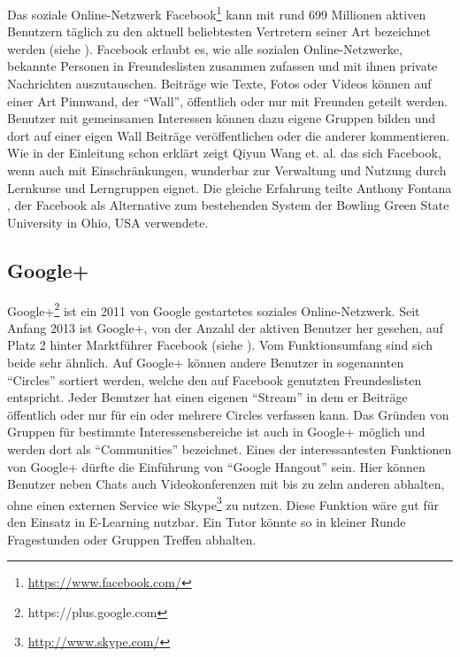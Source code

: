 Das soziale Online-Netzwerk Facebook\footnote{\url{https://www.facebook.com/}} kann mit rund 699 Millionen aktiven Benutzern täglich zu den aktuell beliebtesten Vertretern seiner Art bezeichnet werden (siehe \cite{Facebook2013}). Facebook erlaubt es, wie alle sozialen Online-Netzwerke, bekannte Personen in Freundeslisten zusammen zufassen und mit ihnen private Nachrichten auszutauschen. Beiträge wie Texte, Fotos oder Videos können auf einer Art Pinnwand, der \enquote{Wall}, öffentlich oder nur mit Freunden geteilt werden. Benutzer mit gemeinsamen Interessen können dazu eigene Gruppen bilden und dort auf einer eigen Wall Beiträge veröffentlichen oder die anderer kommentieren. Wie in der Einleitung schon erklärt zeigt Qiyun Wang et. al. \cite{Wang2012} das sich Facebook, wenn auch mit Einschränkungen, wunderbar zur Verwaltung und Nutzung durch Lernkurse und Lerngruppen eignet. Die gleiche Erfahrung teilte Anthony Fontana \cite{Fontana2009,FacebookinEducarion2010}, der Facebook als Alternative zum bestehenden System der Bowling Green State University in Ohio, USA verwendete.


\subsection{Google+} %
\label{sub:google_plus}

Google+\footnote{https://plus.google.com} ist ein 2011 von Google gestartetes soziales Online-Netzwerk. Seit Anfang 2013 ist Google+, von der Anzahl der aktiven Benutzer her gesehen, auf Platz 2 hinter Marktführer Facebook (siehe \cite{Thomas2013}). Vom Funktionsumfang sind sich beide sehr ähnlich. Auf Google+ können andere Benutzer in sogenannten \enquote{Circles} sortiert werden, welche den auf Facebook genutzten Freundeslisten entspricht. Jeder Benutzer hat einen eigenen \enquote{Stream} in dem er Beiträge öffentlich oder nur für ein oder mehrere Circles verfassen kann. Das Gründen von Gruppen für bestimmte Interessensbereiche ist auch in Google+ möglich und werden dort als \enquote{Communities} bezeichnet. Eines der interessantesten Funktionen von Google+ dürfte die Einführung von \enquote{Google Hangout} sein. Hier können Benutzer neben Chats auch Videokonferenzen mit bis zu zehn anderen abhalten, ohne einen externen Service wie Skype\footnote{\url{http://www.skype.com/}} zu nutzen. Diese Funktion wäre gut für den Einsatz in E-Learning nutzbar. Ein Tutor könnte so in kleiner Runde Fragestunden oder Gruppen Treffen abhalten.

